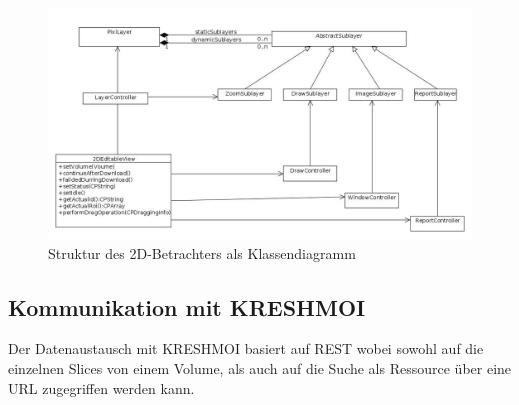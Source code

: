 \begin{figure}[t]
	\centering
		\includegraphics[width=\linewidth]{img/s3_2dview_class_structure.jpg}
	\caption{Struktur des 2D-Betrachters als Klassendiagramm}
	\label{fig:omip_aplication_layout}
\end{figure}

\subsection{Kommunikation mit KRESHMOI}
\label{sec:Kommunikation mit KRESHMOI}
Der Datenaustausch mit KRESHMOI basiert auf REST wobei sowohl auf die einzelnen Slices von einem Volume, als auch auf die Suche als Ressource über eine URL zugegriffen werden kann.

